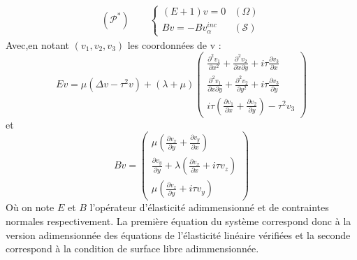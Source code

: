 \begin{eqnarray}
(\mathcal{P}^*) \hspace{2em} \left\{
\begin{array}{lr}
(E+1)v=0 & (\Omega) \\
Bv=-Bv_{\alpha}^{inc} & (\mathcal{S})
\end{array}
\right.
\label{Padim}
\end{eqnarray}
Avec,en notant $(v_1,v_2,v_3)$ les coordonnées de v :
\begin{equation}
Ev=\mu (\Delta v -\tau^2 v)+(\lambda+\mu)
\begin{pmatrix}
\frac{\partial^2 v_1}{\partial x^2}+\frac{\partial^2 v_2}{\partial x \partial y} + i\tau\frac{\partial v_3}{\partial x} \\
\frac{\partial^2 v_1}{\partial x \partial y}+\frac{\partial^2 v_2}{\partial y^2}+ i\tau\frac{\partial v_3}{\partial y}\\
i\tau\left( \frac{\partial v_1}{\partial x}+\frac{\partial v_2}{\partial y}\right)-\tau^2 v_3
\end{pmatrix}
\label{Eadim}
\end{equation}
et
\begin{equation}
Bv=\begin{pmatrix}
\mu \left(\frac{\partial v_x}{\partial y}+\frac{\partial v_y}{\partial x}\right) \\
\frac{\partial v_y}{\partial y}+\lambda\left( \frac{\partial v_x}{\partial x}+i\tau v_z\right)\\
\mu \left(\frac{\partial v_z}{\partial y}+i\tau v_y\right)
\end{pmatrix}
\label{Badim}
\end{equation}
Où on note $E$ et $B$  l'opérateur d'élasticité adimmensionné et de contraintes normales respectivement. La première équation du système correspond donc à la version adimensionnée des équations de l'élasticité linéaire vérifiées et la seconde correspond à la condition de surface libre adimmensionnée.